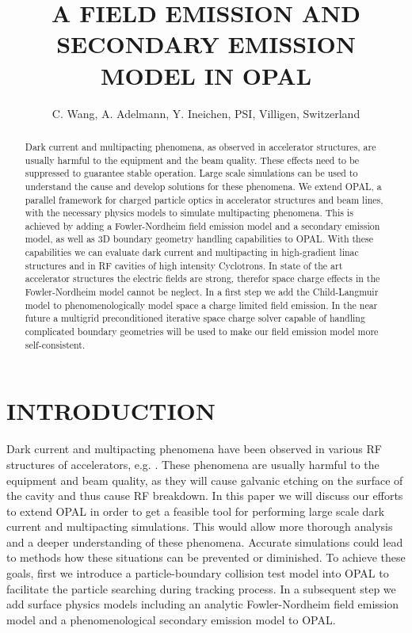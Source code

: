 \documentclass{JAC2003}
\begin{document}
\title{A FIELD EMISSION AND SECONDARY EMISSION MODEL IN OPAL}

\author{C. Wang, A. Adelmann, Y. Ineichen, PSI, Villigen, Switzerland}

\maketitle

\begin{abstract}
   Dark current and multipacting phenomena, as observed in accelerator
structures, are usually harmful to the equipment and the beam quality.
These effects need to be suppressed to guarantee stable operation. Large scale
simulations can be used to understand the cause and develop solutions for these
phenomena. 
We extend OPAL\cite{OP}, a parallel framework for charged particle
optics in accelerator structures and beam lines, with the necessary physics models
to simulate multipacting phenomena. This is achieved by adding a Fowler-Nordheim
field emission model and a secondary emission model, as well as 3D boundary
geometry handling capabilities to OPAL. 
With these capabilities we can evaluate dark current and multipacting in
high-gradient linac structures and in RF cavities of high intensity Cyclotrons.
In state of the art accelerator structures the electric fields are strong,
therefor space charge effects in the Fowler-Nordheim model cannot be neglect. In
a first step we add the Child-Langmuir model to phenomenologically model space
a charge limited field emission. In the near future a multigrid preconditioned
iterative space charge solver capable of handling complicated boundary
geometries will be used to make our field emission model more self-consistent.
\end{abstract}

\section{INTRODUCTION}

Dark current and multipacting phenomena have been observed in various RF
structures of accelerators, e.g. \cite{DE}\cite{CY}. These phenomena are usually
harmful to the equipment and beam quality, as they will cause galvanic
etching on the surface of the cavity and thus cause RF breakdown. In this paper
we will discuss our efforts to extend OPAL in order to get a feasible tool
for performing large scale dark current and multipacting simulations. This would
allow more thorough analysis and a deeper understanding of these phenomena.
Accurate simulations could lead to methods how these situations can be prevented
or diminished. 
To achieve these goals, first we introduce a particle-boundary collision test
model into OPAL to facilitate the particle searching during tracking process. In
a subsequent step we add surface physics models including an analytic
Fowler-Nordheim field emission model and a phenomenological secondary emission
model to OPAL.
\end{document}
